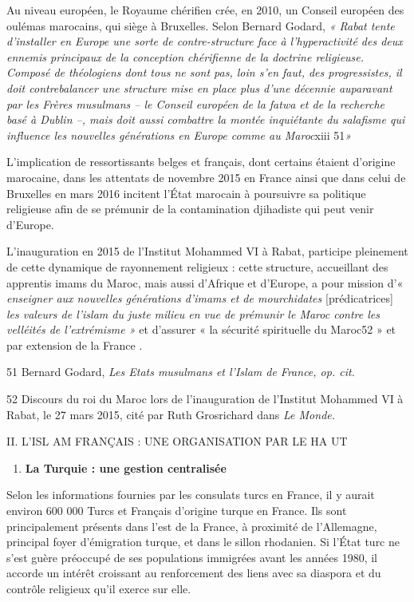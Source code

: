 Au niveau européen, le Royaume chérifien crée, en 2010, un Conseil
européen des oulémas marocains, qui siège à Bruxelles. Selon Bernard
Godard, \emph{« Rabat tente d'installer en Europe une sorte de
contre-structure face à l'hyperactivité des deux ennemis principaux de
la conception chérifienne de la doctrine religieuse. Composé de
théologiens dont tous ne sont pas, loin s'en faut, des progressistes, il
doit contrebalancer une structure mise en place plus d'une décennie
auparavant par les Frères musulmans -- le Conseil européen de la fatwa
et de la recherche basé à Dublin --, mais doit aussi combattre la montée
inquiétante du salafisme qui influence les nouvelles générations en
Europe comme au Maroc}xiii 51\emph{»}

L'implication de ressortissants belges et français, dont certains
étaient d'origine marocaine, dans les attentats de novembre 2015 en
France ainsi que dans celui de Bruxelles en mars 2016 incitent l'État
marocain à poursuivre sa politique religieuse afin de se prémunir de la
contamination djihadiste qui peut venir d'Europe.

L'inauguration en 2015 de l'Institut Mohammed VI à Rabat, participe
pleinement de cette dynamique de rayonnement religieux : cette
structure, accueillant des apprentis imams du Maroc, mais aussi
d'Afrique et d'Europe, a pour mission d'« \emph{enseigner aux nouvelles
générations d'imams et de mourchidates} {[}prédicatrices{]} \emph{les
valeurs de l'islam du juste milieu en vue de prémunir le Maroc contre
les velléités de l'extrémisme »} et d'assurer « la sécurité spirituelle
du Maroc52 » et par extension de la France .

51 Bernard Godard, \emph{Les Etats musulmans et l'Islam de France, op.
cit.}

52 Discours du roi du Maroc lors de l'inauguration de l'Institut
Mohammed VI à Rabat, le 27 mars 2015, cité par Ruth Grosrichard dans
\emph{Le Monde.}

II. L'ISL AM FRANÇAIS : UNE ORGANISATION PAR LE HA UT


\begin{enumerate}
\def\labelenumi{\arabic{enumi}.}
\setcounter{enumi}{2}
\item
  
  \textbf{La Turquie : une gestion centralisée}
  
\end{enumerate}


Selon les informations fournies par les consulats turcs en France, il y
aurait environ 600 000 Turcs et Français d'origine turque en France. Ils
sont principalement présents dans l'est de la France, à proximité de
l'Allemagne, principal foyer d'émigration turque, et dans le sillon
rhodanien. Si l'État turc ne s'est guère préoccupé de ses populations
immigrées avant les années 1980, il accorde un intérêt croissant au
renforcement des liens avec sa diaspora et du contrôle religieux qu'il
exerce sur elle.

